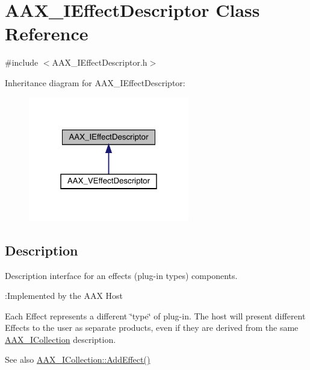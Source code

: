 \hypertarget{a01813}{}\section{A\+A\+X\+\_\+\+I\+Effect\+Descriptor Class Reference}
\label{a01813}


{\ttfamily \#include $<$A\+A\+X\+\_\+\+I\+Effect\+Descriptor.\+h$>$}



Inheritance diagram for A\+A\+X\+\_\+\+I\+Effect\+Descriptor\+:
\nopagebreak
\begin{figure}[H]
\begin{center}
\leavevmode
\includegraphics[width=199pt]{a01812}
\end{center}
\end{figure}


\subsection{Description}
Description interface for an effect\textquotesingle{}s (plug-\/in type\textquotesingle{}s) components. 

\begin{DoxyRefDesc}{\+:\+Implemented by the A\+A\+X Host}
\item[\mbox{\hyperlink{a00790__aax_host_implementation000006}{\+:\+Implemented by the A\+A\+X Host}}]\end{DoxyRefDesc}


Each Effect represents a different \char`\"{}type\char`\"{} of plug-\/in. The host will present different Effects to the user as separate products, even if they are derived from the same \mbox{\hyperlink{a01777}{A\+A\+X\+\_\+\+I\+Collection}} description.

\begin{DoxySeeAlso}{See also}
\mbox{\hyperlink{a01777_a5ff114b8c4da2081515186f2faf65c8c}{A\+A\+X\+\_\+\+I\+Collection\+::\+Add\+Effect()}} 
\end{DoxySeeAlso}
